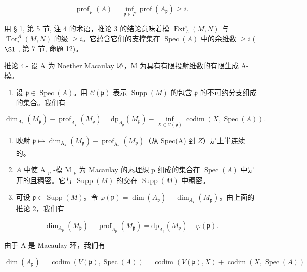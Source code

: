 \[
\operatorname{prof} _ {F} (A) = \inf _ {\mathfrak {p} \in F} \operatorname{prof} (A _ {\mathfrak {p}}) \geqslant i.
\]

用 § 1, 第 5 节, 注 4 的术语，推论 3 的结论意味着模 \(\operatorname{Ext}_{A}^{i}(M,N)\) 与 \(\operatorname{Tor}_{i}^{A}(M,N)\) 的级 \(\geqslant i\)。它蕴含它们的支撑集在 \(\operatorname{Spec}(A)\) 中的余维数 \(\geqslant i\) ( \(\S 1\) , 第 7 节, 命题 12)。

推论 4.- 设 A 为 Noether Macaulay 环，M 为具有有限投射维数的有限生成 A-模。

\begin{enumerate}
\def\labelenumi{\alph{enumi})}
\tightlist
\item
  设 \(\mathfrak{p} \in \operatorname{Spec}(A)\)。用 \(\mathcal{C}(\mathfrak{p})\) 表示 \(\operatorname{Supp}(M)\) 的包含 \(\mathfrak{p}\) 的不可约分支组成的集合。我们有
\end{enumerate}

\[
\dim_ {A _ {\mathfrak {p}}} \left(M _ {\mathfrak {p}}\right) - \operatorname{prof} _ {A _ {\mathfrak {p}}} \left(M _ {\mathfrak {p}}\right) = \mathrm{dp} _ {A _ {\mathfrak {p}}} \left(M _ {\mathfrak {p}}\right) - \inf _ {X \in \mathscr {C} (\mathfrak {p})} \operatorname{codim} (X, \operatorname{Spec} (A)).
\]

\begin{enumerate}
\def\labelenumi{\alph{enumi})}
\setcounter{enumi}{1}
\item
  映射 \(\mathfrak{p}\mapsto\dim_{\mathrm{A}_{\mathfrak{p}}}(M_{\mathfrak{p}})-\operatorname{prof}_{\mathrm{A}_{\mathfrak{p}}}(M_{\mathfrak{p}})\)（从 Spec(A) 到 \(\overline{Z}\)）是上半连续的。
\item
  \(A\) 中使 A \(_{p}\) -模 M \(_{p}\) 为 Macaulay 的素理想 p 组成的集合在 \(\operatorname{Spec}(A)\) 中是开的且稠密。它与 \(\operatorname{Supp}(M)\) 的交在 \(\operatorname{Supp}(M)\) 中稠密。
\item
  可设 \(\mathfrak{p} \in \operatorname{Supp}(M)\)。令 \(\varphi(\mathfrak{p}) = \dim(A_{\mathfrak{p}}) - \dim_{A_{\mathfrak{p}}}(M_{\mathfrak{p}})\)。由上面的推论 2，我们有
\end{enumerate}

\[
\dim_ {A _ {\mathfrak {p}}} (M _ {\mathfrak {p}}) - \operatorname{prof} _ {A _ {\mathfrak {p}}} (M _ {\mathfrak {p}}) = \mathrm{dp} _ {A _ {\mathfrak {p}}} (M _ {\mathfrak {p}}) - \varphi (\mathfrak {p}).
\]

由于 A 是 Macaulay 环，我们有

\[
\dim (A _ {\mathfrak {p}}) = \operatorname{codim} (V (\mathfrak {p}), \operatorname{Spec} (A)) = \operatorname{codim} (V (\mathfrak {p}), X) + \operatorname{codim} (X, \operatorname{Spec} (A))
\]


